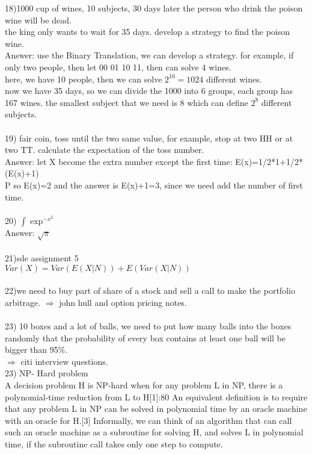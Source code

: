 \documentclass[12pt]{article}
\theoremstyle{plain}
\begin{document}
18)1000 cup of wines, 10 subjects, 30 days later the person who drink the poison wine will be dead.\\ the king only wants to wait for 35 days. develop a strategy to find the poison wine.\\
Answer: use the Binary Translation, we can develop a strategy. for example, if only two people, then let 00 01 10 11, then can solve 4 wines. \\
here, we have 10 people, then we can solve $2^{10}=1024$ different wines.\\
now we have 35 days, so we can divide the 1000 into 6 groups, each group has 167 wines. the smallest subject that we need is 8 which can define $2^8$ different subjects.\\\\
19) fair coin, toss until the two same value, for example, stop at two HH or at two TT. calculate the expectation of the toss number.\\
Answer:  let X become the extra number except the first time:
E(x)=1/2*1+1/2*(E(x)+1)\\
P
so E(x)=2 and the answer is E(x)+1=3, since we need add the number of first time.
\\\\
20) $\int{\exp^{-x^2}}$\\
Answer: $\sqrt{\pi}$
\\\\
21)sde assignment 5 \\
$Var(X)=Var(E(X|N))+E(Var(X|N))$
\\
\\
22)we need to buy part of share of a stock and sell a call to make the portfolio arbitrage. $\Longrightarrow$ john hull and option pricing notes.\\\\
23) 10 boxes and a lot of balls, we need to put how many balls into the boxes randomly that the probability of every box contains at least one ball will be bigger than 95\%.\\
$\Longrightarrow$ citi interview questions.\\
23) NP- Hard problem \\
A decision problem H is NP-hard when for any problem L in NP, there is a polynomial-time reduction from L to H[1]:80 An equivalent definition is to require that any problem L in NP can be solved in polynomial time by an oracle machine with an oracle for H.[3] Informally, we can think of an algorithm that can call such an oracle machine as a subroutine for solving H, and solves L in polynomial time, if the subroutine call takes only one step to compute.
\end{document}
